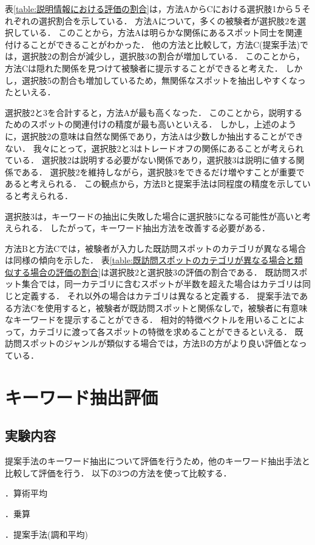 \documentclass{deimj}
\begin{document}
表\ref{table:説明情報における評価の割合}は，方法AからCにおける選択肢1から５それぞれの選択割合を示している．
方法Aについて，多くの被験者が選択肢2を選択している．
このことから，方法Aは明らかな関係にあるスポット同士を関連付けることができることがわかった．
他の方法と比較して，方法C(提案手法)では，選択肢2の割合が減少し，選択肢3の割合が増加している．
このことから，方法Cは隠れた関係を見つけて被験者に提示することができると考えた．
しかし，選択肢5の割合も増加しているため，無関係なスポットを抽出しやすくなったといえる．

選択肢2と3を合計すると，方法Aが最も高くなった．
このことから，説明するためのスポットの関連付けの精度が最も高いといえる．
しかし，上述のように，選択肢2の意味は自然な関係であり，方法Aは少数しか抽出することができない．
我々にとって，選択肢2と3はトレードオフの関係にあることが考えられている．
選択肢2は説明する必要がない関係であり，選択肢3は説明に値する関係である．
選択肢2を維持しながら，選択肢3をできるだけ増やすことが重要であると考えられる．
この観点から，方法Bと提案手法は同程度の精度を示していると考えられる．

選択肢3は，キーワードの抽出に失敗した場合に選択肢5になる可能性が高いと考えられる．
したがって，キーワード抽出方法を改善する必要がある．

方法Bと方法Cでは，被験者が入力した既訪問スポットのカテゴリが異なる場合は同様の傾向を示した．
表\ref{table:既訪問スポットのカテゴリが異なる場合と類似する場合の評価の割合}は選択肢2と選択肢3の評価の割合である．
既訪問スポット集合では，同一カテゴリに含むスポットが半数を超えた場合はカテゴリは同じと定義する．
それ以外の場合はカテゴリは異なると定義する．
提案手法である方法Cを使用すると，被験者が既訪問スポットと関係なしで，被験者に有意味なキーワードを提示することができる．
相対的特徴ベクトルを用いることによって，カテゴリに渡って各スポットの特徴を求めることができるといえる．
既訪問スポットのジャンルが類似する場合では，方法Bの方がより良い評価となっている．


\section{キーワード抽出評価}
\label{sec:キーワード抽出評価}
\subsection{実験内容}
提案手法のキーワード抽出について評価を行うため，他のキーワード抽出手法と比較して評価を行う．
以下の3つの方法を使って比較する．
\begin{description}
  \item {}．算術平均
  \item {}．乗算
  \item {}．提案手法(調和平均)
\end{description}
\end{document}
